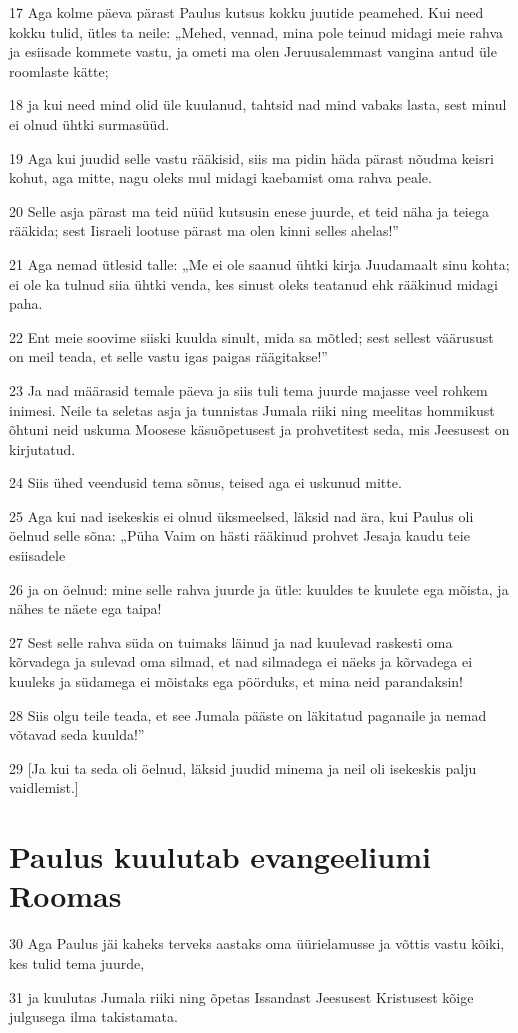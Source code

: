 \par 17 Aga kolme päeva pärast Paulus kutsus kokku juutide peamehed. Kui need kokku tulid, ütles ta neile: „Mehed, vennad, mina pole teinud midagi meie rahva ja esiisade kommete vastu, ja ometi ma olen Jeruusalemmast vangina antud üle roomlaste kätte;
\par 18 ja kui need mind olid üle kuulanud, tahtsid nad mind vabaks lasta, sest minul ei olnud ühtki surmasüüd.
\par 19 Aga kui juudid selle vastu rääkisid, siis ma pidin häda pärast nõudma keisri kohut, aga mitte, nagu oleks mul midagi kaebamist oma rahva peale.
\par 20 Selle asja pärast ma teid nüüd kutsusin enese juurde, et teid näha ja teiega rääkida; sest Iisraeli lootuse pärast ma olen kinni selles ahelas!”
\par 21 Aga nemad ütlesid talle: „Me ei ole saanud ühtki kirja Juudamaalt sinu kohta; ei ole ka tulnud siia ühtki venda, kes sinust oleks teatanud ehk rääkinud midagi paha.
\par 22 Ent meie soovime siiski kuulda sinult, mida sa mõtled; sest sellest väärusust on meil teada, et selle vastu igas paigas räägitakse!”
\par 23 Ja nad määrasid temale päeva ja siis tuli tema juurde majasse veel rohkem inimesi. Neile ta seletas asja ja tunnistas Jumala riiki ning meelitas hommikust õhtuni neid uskuma Moosese käsuõpetusest ja prohvetitest seda, mis Jeesusest on kirjutatud.
\par 24 Siis ühed veendusid tema sõnus, teised aga ei uskunud mitte.
\par 25 Aga kui nad isekeskis ei olnud üksmeelsed, läksid nad ära, kui Paulus oli öelnud selle sõna: „Püha Vaim on hästi rääkinud prohvet Jesaja kaudu teie esiisadele
\par 26 ja on öelnud: mine selle rahva juurde ja ütle: kuuldes te kuulete ega mõista, ja nähes te näete ega taipa!
\par 27 Sest selle rahva süda on tuimaks läinud ja nad kuulevad raskesti oma kõrvadega ja sulevad oma silmad, et nad silmadega ei näeks ja kõrvadega ei kuuleks ja südamega ei mõistaks ega pöörduks, et mina neid parandaksin!
\par 28 Siis olgu teile teada, et see Jumala pääste on läkitatud paganaile ja nemad võtavad seda kuulda!”
\par 29 [Ja kui ta seda oli öelnud, läksid juudid minema ja neil oli isekeskis palju vaidlemist.]

\section*{Paulus kuulutab evangeeliumi Roomas}

\par 30 Aga Paulus jäi kaheks terveks aastaks oma üürielamusse ja võttis vastu kõiki, kes tulid tema juurde,
\par 31 ja kuulutas Jumala riiki ning õpetas Issandast Jeesusest Kristusest kõige julgusega ilma takistamata.



